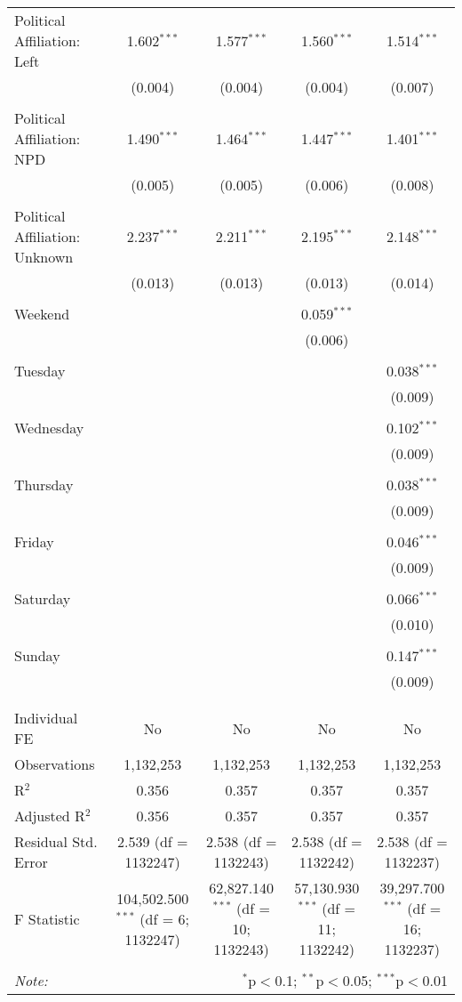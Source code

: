 \documentclass[
]{article}
\begin{document}
\begin{table}[!htbp]
{\begin{tabular}{@{\extracolsep{5pt}}lcccc}
 Political Affiliation: Left & 1.602$^{***}$ & 1.577$^{***}$ & 1.560$^{***}$ & 1.514$^{***}$ \\ 
  & (0.004) & (0.004) & (0.004) & (0.007) \\ 
  & & & & \\ 
 Political Affiliation: NPD & 1.490$^{***}$ & 1.464$^{***}$ & 1.447$^{***}$ & 1.401$^{***}$ \\ 
  & (0.005) & (0.005) & (0.006) & (0.008) \\ 
  & & & & \\ 
 Political Affiliation: Unknown & 2.237$^{***}$ & 2.211$^{***}$ & 2.195$^{***}$ & 2.148$^{***}$ \\ 
  & (0.013) & (0.013) & (0.013) & (0.014) \\ 
  & & & & \\ 
 Weekend &  &  & 0.059$^{***}$ &  \\ 
  &  &  & (0.006) &  \\ 
  & & & & \\ 
 Tuesday &  &  &  & 0.038$^{***}$ \\ 
  &  &  &  & (0.009) \\ 
  & & & & \\ 
 Wednesday &  &  &  & 0.102$^{***}$ \\ 
  &  &  &  & (0.009) \\ 
  & & & & \\ 
 Thursday &  &  &  & 0.038$^{***}$ \\ 
  &  &  &  & (0.009) \\ 
  & & & & \\ 
 Friday &  &  &  & 0.046$^{***}$ \\ 
  &  &  &  & (0.009) \\ 
  & & & & \\ 
 Saturday &  &  &  & 0.066$^{***}$ \\ 
  &  &  &  & (0.010) \\ 
  & & & & \\ 
 Sunday &  &  &  & 0.147$^{***}$ \\ 
  &  &  &  & (0.009) \\ 
  & & & & \\ 
\hline \\[-1.8ex] 
Individual FE & No & No & No & No \\ 
Observations & 1,132,253 & 1,132,253 & 1,132,253 & 1,132,253 \\ 
R$^{2}$ & 0.356 & 0.357 & 0.357 & 0.357 \\ 
Adjusted R$^{2}$ & 0.356 & 0.357 & 0.357 & 0.357 \\ 
Residual Std. Error & 2.539 (df = 1132247) & 2.538 (df = 1132243) & 2.538 (df = 1132242) & 2.538 (df = 1132237) \\ 
F Statistic & 104,502.500$^{***}$ (df = 6; 1132247) & 62,827.140$^{***}$ (df = 10; 1132243) & 57,130.930$^{***}$ (df = 11; 1132242) & 39,297.700$^{***}$ (df = 16; 1132237) \\ 
\hline 
\hline \\[-1.8ex] 
\textit{Note:}  & \multicolumn{4}{r}{$^{*}$p$<$0.1; $^{**}$p$<$0.05; $^{***}$p$<$0.01} \\ 
\end{tabular}
} 
\end{table} 
\newpage
\end{document}
